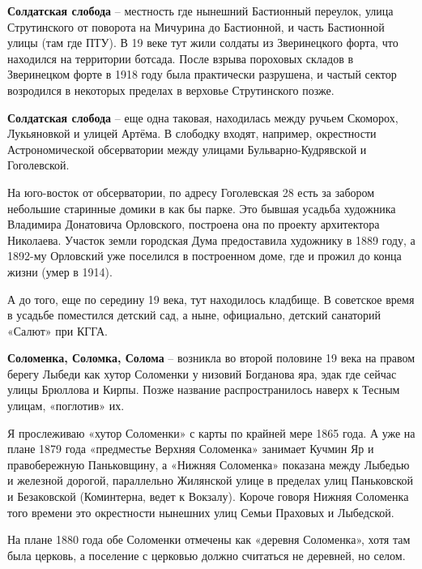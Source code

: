 \textbf{Солдатская слобода} – местность где нынешний Бастионный переулок, улица Струтинского от поворота на Мичурина до Бастионной, и часть Бастионной улицы (там где ПТУ). В 19 веке тут жили солдаты из Зверинецкого форта, что находился на территории ботсада. После взрыва пороховых складов в Зверинецком форте в 1918 году была практически разрушена, и частый сектор возродился в некоторых пределах в верховье Струтинского позже.\\

\medskip

\textbf{Солдатская слобода} – еще одна таковая, находилась между ручьем Скоморох, Лукьяновкой и улицей Артёма. В слободку входят, например, окрестности Астрономической обсерватории между улицами Бульварно-Кудрявской и Гоголевской.

На юго-восток от обсерватории, по адресу Гоголевская 28 есть за забором небольшие старинные домики в как бы парке. Это бывшая усадьба художника Владимира Донатовича Орловского, построена она по проекту архитектора Николаева. Участок земли городская Дума предоставила художнику в 1889 году, а 1892-му Орловский уже поселился в построенном доме, где и прожил до конца жизни (умер в 1914).

А до того, еще по середину 19 века, тут находилось кладбище. В советское время в усадьбе поместился детский сад, а ныне, официально, детский санаторий «Салют» при КГГА.\\

\medskip

\textbf{Соломенка, Соломка, Солома} – возникла во второй половине 19 века на правом берегу Лыбеди как хутор Соломенки у низовий Богданова яра, эдак где сейчас улицы Брюллова и Кирпы. Позже название распространилось наверх к Тесным улицам, «поглотив» их. 

Я прослеживаю «хутор Соломенки» с карты по крайней мере 1865 года. А уже на плане 1879 года «предместье Верхняя Соломенка» занимает Кучмин Яр и правобережную Паньковщину, а «Нижняя Соломенка» показана между Лыбедью и железной дорогой, параллельно Жилянской улице в пределах улиц Паньковской и Безаковской (Коминтерна, ведет к Вокзалу). Короче говоря Нижняя Соломенка того времени это окрестности нынешних улиц Семьи Праховых и Лыбедской.

На плане 1880 года обе Соломенки отмечены как «деревня Соломенка», хотя там была церковь, а поселение с церковью должно считаться не деревней, но селом.\\

\medskip

